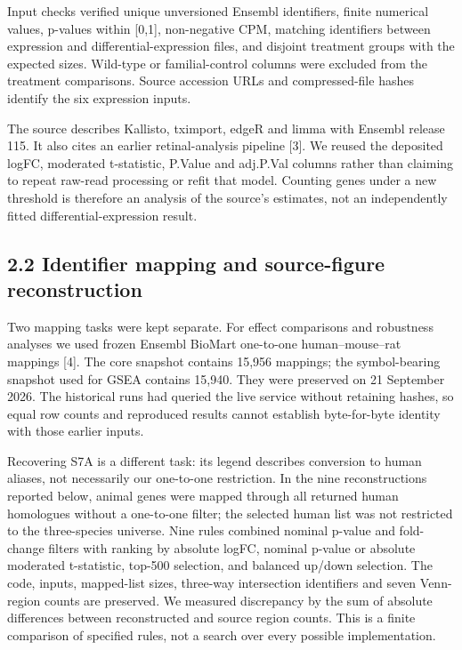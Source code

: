 \documentclass[a4paper,10pt]{article}
\begin{document}
Input checks verified unique unversioned Ensembl identifiers, finite numerical values, p-values within [0,1], non-negative CPM, matching identifiers between expression and differential-expression files, and disjoint treatment groups with the expected sizes. Wild-type or familial-control columns were excluded from the treatment comparisons. Source accession URLs and compressed-file hashes identify the six expression inputs.

The source describes Kallisto, tximport, edgeR and limma with Ensembl release 115. It also cites an earlier retinal-analysis pipeline [3]. We reused the deposited logFC, moderated t-statistic, P.Value and adj.P.Val columns rather than claiming to repeat raw-read processing or refit that model. Counting genes under a new threshold is therefore an analysis of the source's estimates, not an independently fitted differential-expression result.

\subsection*{2.2 Identifier mapping and source-figure reconstruction}
Two mapping tasks were kept separate. For effect comparisons and robustness analyses we used frozen Ensembl BioMart one-to-one human–mouse–rat mappings [4]. The core snapshot contains 15,956 mappings; the symbol-bearing snapshot used for GSEA contains 15,940. They were preserved on 21 September 2026. The historical runs had queried the live service without retaining hashes, so equal row counts and reproduced results cannot establish byte-for-byte identity with those earlier inputs.

Recovering S7A is a different task: its legend describes conversion to human aliases, not necessarily our one-to-one restriction. In the nine reconstructions reported below, animal genes were mapped through all returned human homologues without a one-to-one filter; the selected human list was not restricted to the three-species universe. Nine rules combined nominal p-value and fold-change filters with ranking by absolute logFC, nominal p-value or absolute moderated t-statistic, top-500 selection, and balanced up/down selection. The code, inputs, mapped-list sizes, three-way intersection identifiers and seven Venn-region counts are preserved. We measured discrepancy by the sum of absolute differences between reconstructed and source region counts. This is a finite comparison of specified rules, not a search over every possible implementation.
\end{document}
